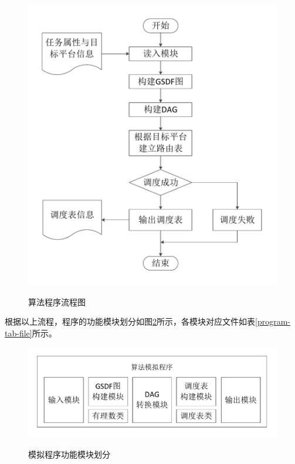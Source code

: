 \begin{figure}[!hbt]
  \centering
  \includegraphics[height=55ex]{figure/PROG-flow.pdf}\\
  \caption{算法程序流程图}\label{PROG-fig-flow}
\end{figure}

根据以上流程，程序的功能模块划分如图\ref{PROG-fig-module}所示，各模块对应文件如表\ref{program-tab-file}所示。

\begin{figure}[!hbt]
  \centering
  \includegraphics[height=20ex]{figure/PROG-module.pdf}\\
  \caption{模拟程序功能模块划分}\label{PROG-fig-module}
\end{figure}

